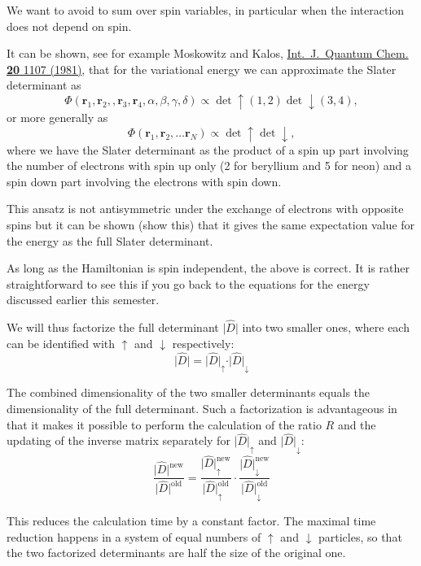 \documentclass[%
oneside,                 %
final,                   %
10pt]{article}
\begin{document}
We want to avoid to sum over spin variables, in particular when the interaction does not depend on spin.

It can be shown, see for example Moskowitz and Kalos, \href{{http://onlinelibrary.wiley.com/doi/10.1002/qua.560200508/abstract}}{Int.~J.~Quantum Chem. \textbf{20} 1107 (1981)}, that for the variational energy
we can approximate the Slater determinant as  
\[
   \Phi(\mathbf{r}_1,\mathbf{r}_2,,\mathbf{r}_3,\mathbf{r}_4, \alpha,\beta,\gamma,\delta) \propto \det\uparrow(1,2)\det\downarrow(3,4),
\]
or more generally as 
\[
   \Phi(\mathbf{r}_1,\mathbf{r}_2,\dots \mathbf{r}_N) \propto \det\uparrow \det\downarrow,
\]
where we have the Slater determinant as the product of a spin up part involving the number of electrons with spin up only (2 for beryllium and 5 for neon) and a spin down part involving the electrons with spin down.

This ansatz is not antisymmetric under the exchange of electrons with  opposite spins but it can be shown (show this) that it gives the same
expectation value for the energy as the full Slater determinant.

As long as the Hamiltonian is spin independent, the above is correct. It is rather straightforward to see this if you go back to the equations for the energy discussed earlier  this semester.

We will thus
factorize the full determinant $\vert\hat{D}\vert$ into two smaller ones, where 
each can be identified with $\uparrow$ and $\downarrow$
respectively:
\[
\vert\hat{D}\vert = \vert\hat{D}\vert_\uparrow\cdot \vert\hat{D}\vert_\downarrow
\]

The combined dimensionality of the two smaller determinants equals the
dimensionality of the full determinant. Such a factorization is
advantageous in that it makes it possible to perform the calculation
of the ratio $R$ and the updating of the inverse matrix separately for
$\vert\hat{D}\vert_\uparrow$ and $\vert\hat{D}\vert_\downarrow$:
\[
\frac{\vert\hat{D}\vert^\mathrm{new}}{\vert\hat{D}\vert^\mathrm{old}} =
\frac{\vert\hat{D}\vert^\mathrm{new}_\uparrow}
{\vert\hat{D}\vert^\mathrm{old}_\uparrow}\cdot
\frac{\vert\hat{D}\vert^\mathrm{new}_\downarrow
}{\vert\hat{D}\vert^\mathrm{old}_\downarrow}
\]

This reduces the calculation time by a constant factor. The maximal
time reduction happens in a system of equal numbers of $\uparrow$ and
$\downarrow$ particles, so that the two factorized determinants are
half the size of the original one.
\end{document}
